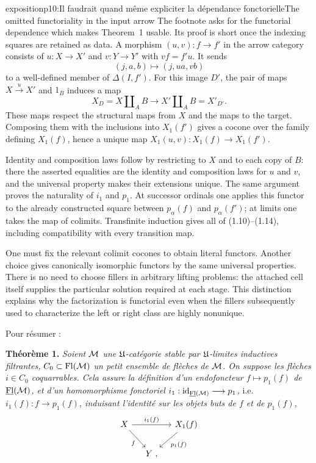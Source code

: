 \begin{dcomment}{exposition}{p10:Il faudrait quand même expliciter la dépendance fonctorielle}{The omitted functoriality in the input arrow}
The footnote asks for the functorial dependence which makes Theorem~1 usable. Its proof is short once the indexing squares are retained as data. A morphism $(u,v):f\to f'$ in the arrow category consists of $u:X\to X'$ and $v:Y\to Y'$ with $vf=f'u$. It sends
\[
 (j,a,b)\longmapsto(j,ua,vb)
\]
to a well-defined member of $\Delta(I,f')$. For this image $D'$, the pair of maps $X\xrightarrow{u}X'$ and $1_B$ induces a map
\[
 X_D=X\amalg_A B\longrightarrow X'\amalg_A B=X'_{D'}.
\]
These maps respect the structural maps from $X$ and the maps to the target. Composing them with the inclusions into $X_1(f')$ gives a cocone over the family defining $X_1(f)$, hence a unique map $X_1(u,v):X_1(f)\to X_1(f')$.

Identity and composition laws follow by restricting to $X$ and to each copy of $B$: there the asserted equalities are the identity and composition laws for $u$ and $v$, and the universal property makes their extensions unique. The same argument proves the naturality of $i_1$ and $p_1$. At successor ordinals one applies this functor to the already constructed square between $p_\alpha(f)$ and $p_\alpha(f')$; at limits one takes the map of colimits. Transfinite induction gives all of (1.10)--(1.14), including compatibility with every transition map.

One must fix the relevant colimit cocones to obtain literal functors. Another choice gives canonically isomorphic functors by the same universal properties. There is no need to choose fillers in arbitrary lifting problems: the attached cell itself supplies the particular solution required at each stage. This distinction explains why the factorization is functorial even when the fillers subsequently used to characterize the left or right class are highly nonunique.
\end{dcomment}


Pour résumer :

\textbf{Théorème 1.} \textit{Soient $\mathcal{M}$ une $\mathfrak{U}$-catégorie stable par $\mathfrak{U}$-limites inductives filtrantes, $C_0 \subset \mathrm{Fl}(\mathcal{M})$ un petit ensemble de flèches de $\mathcal{M}$. On suppose les flèches $i \in C_0$ coquarrables. Cela assure la définition d'un endofoncteur $f \longmapsto p_1(f)$ de $\underline{\mathrm{Fl}}(\mathcal{M})$, et d'un homomorphisme fonctoriel $i_1 : \mathrm{id}_{\underline{\mathrm{Fl}}(\mathcal{M})} \longrightarrow p_1$,} i.e. \textit{$i_1(f) : f \longrightarrow p_1(f)$, induisant l'identité sur les objets buts de $f$ et de $p_1(f)$,}
\[
\begin{tikzcd}[column sep=small]
X \arrow[rr, "i_1(f)"] \arrow[dr, "f"'] & & X_1(f) \arrow[dl, "p_1(f)"] \\
 & Y \ , &
\end{tikzcd}
\]


